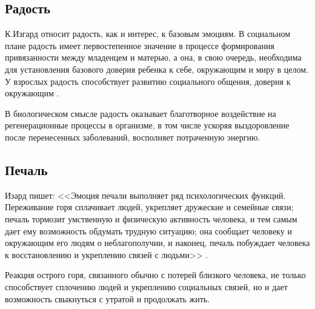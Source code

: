 \documentclass{../../common/thesisbyxetex}
\begin{document}
\subsection*{Радость}

К.Изгард относит радость, как и интерес, к базовым эмоциям. В социальном плане радость имеет 
первостепенное значение в процессе формирования привязанности между младенцем и матерью, а она, в 
свою очередь, необходима для установления базового доверия ребенка  к себе, окружающим и миру в 
целом. У взрослых радость способствует развитию социального общения, доверия к 
окружающим \cite[154]{izpsy}.

В биологическом смысле радость оказывает благотворное воздействие на регенерационные процессы в 
организме, в том числе ускоряя выздоровление после перенесенных заболеваний, восполняет потраченную 
энергию.

\subsection* { Печаль}

Изард пишет: <<Эмоция печали выполняет ряд психологических функций. Переживание горя сплачивает 
людей, укрепляет дружеские и семейные связи; печаль тормозит умственную и физическую активность 
человека, и тем самым дает ему возможность обдумать трудную ситуацию; она сообщает человеку и 
окружающим его людям о неблагополучии, и наконец, печаль побуждает человека к восстановлению и 
укреплению связей с людьми>> \cite[211]{izpsy}.

Реакция острого горя, связанного обычно с потерей близкого человека, не только способствует 
сплочению людей и укреплению социальных связей, но и дает возможность свыкнуться с утратой и 
продолжать жить.
\end{document}

